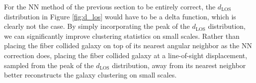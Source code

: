                                                                                                                                                                                                                                                                       For the NN method of the previous section to be entirely correct, 
                                                                                                                                                                                                                                                                      the $d_{\mathrm{LOS}}$ distribution in Figure \ref{fig:d_los} would 
                                                                                                                                                                                                                                                                      have to be a delta function, which is clearly not the case. By simply 
                                                                                                                                                                                                                                                                      incorporating the peak of the $d_{\mathrm{LOS}}$ distribution, we 
                                                                                                                                                                                                                                                                      can significantly improve clustering statistics on small scales. Rather 
                                                                                                                                                                                                                                                                      than placing the fiber collided galaxy on top of its nearest angular 
                                                                                                                                                                                                                                                                      neighbor as the NN correction does, placing the fiber collided galaxy at a 
                                                                                                                                                                                                                                                                      line-of-sight displacement, sampled from the peak of the $d_{\mathrm{LOS}}$
                                                                                                                                                                                                                                                                      distribution, away from its nearest neighbor better reconstructs the 
                                                                                                                                                                                                                                                                      galaxy clustering on small scales. 

